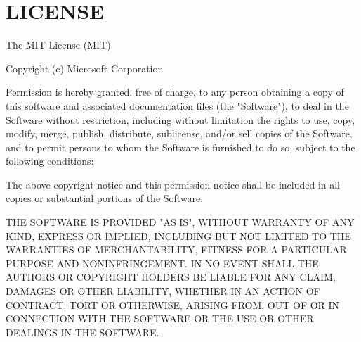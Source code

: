 \chapter{LICENSE}
\hypertarget{md_node__modules_2_0dshikijs_2vscode-textmate_2_l_i_c_e_n_s_e}{}\label{md_node__modules_2_0dshikijs_2vscode-textmate_2_l_i_c_e_n_s_e}
The MIT License (MIT)

Copyright (c) Microsoft Corporation

Permission is hereby granted, free of charge, to any person obtaining a copy of this software and associated documentation files (the "{}\+Software"{}), to deal in the Software without restriction, including without limitation the rights to use, copy, modify, merge, publish, distribute, sublicense, and/or sell copies of the Software, and to permit persons to whom the Software is furnished to do so, subject to the following conditions\+:

The above copyright notice and this permission notice shall be included in all copies or substantial portions of the Software.

THE SOFTWARE IS PROVIDED "{}\+AS IS"{}, WITHOUT WARRANTY OF ANY KIND, EXPRESS OR IMPLIED, INCLUDING BUT NOT LIMITED TO THE WARRANTIES OF MERCHANTABILITY, FITNESS FOR A PARTICULAR PURPOSE AND NONINFRINGEMENT. IN NO EVENT SHALL THE AUTHORS OR COPYRIGHT HOLDERS BE LIABLE FOR ANY CLAIM, DAMAGES OR OTHER LIABILITY, WHETHER IN AN ACTION OF CONTRACT, TORT OR OTHERWISE, ARISING FROM, OUT OF OR IN CONNECTION WITH THE SOFTWARE OR THE USE OR OTHER DEALINGS IN THE SOFTWARE. 